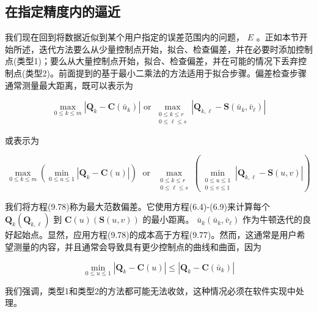 \documentclass[../main.tex]{subfiles}
\begin{document}
\subsection{在指定精度内的逼近}

我们现在回到将数据近似到某个用户指定的误差范围内的问题， \(E\) 。正如本节开始所述，迭代方法要么从少量控制点开始，拟合、检查偏差，并在必要时添加控制点(类型1)；要么从大量控制点开始，拟合、检查偏差，并在可能的情况下丢弃控制点(类型2)。前面提到的基于最小二乘法的方法适用于拟合步骤。偏差检查步骤通常测量最大距离，既可以表示为

\[
\mathop{\max }\limits_{{0 \leq  k \leq  m}}\left| {{\mathbf{Q}}_{k} - \mathbf{C}\left( {\bar{u}}_{k}\right) }\right| \text{ or }\mathop{\max }\limits_{\substack{{0 \leq  k \leq  r} \\  {0 \leq  \ell  \leq  s} }}\left| {{\mathbf{Q}}_{k,\ell } - \mathbf{S}\left( {{\bar{u}}_{k},{\bar{v}}_{\ell }}\right) }\right|  \tag{9.77}
\]

或表示为

\[
\mathop{\max }\limits_{{0 \leq  k \leq  m}}\left( {\mathop{\min }\limits_{{0 \leq  u \leq  1}}\left| {{\mathbf{Q}}_{k} - \mathbf{C}\left( u\right) }\right| }\right) \;\text{ or }\;\mathop{\max }\limits_{\substack{{0 \leq  k \leq  r} \\  {0 \leq  \ell  \leq  s} }}\left( {\mathop{\min }\limits_{\substack{{0 \leq  u \leq  1} \\  {0 \leq  v \leq  1} }}\left| {{\mathbf{Q}}_{k,\ell } - \mathbf{S}\left( {u,v}\right) }\right| }\right)  \tag{9.78}
\]

我们将方程(9.78)称为最大范数偏差。它使用方程(6.4)-(6.9)来计算每个 \({\mathbf{Q}}_{k}\left( {\mathbf{Q}}_{k,\ell }\right)\) 到 \(\mathbf{C}\left( u\right) \left( {\mathbf{S}\left( {u,v}\right) }\right)\) 的最小距离。 \({\bar{u}}_{k}\left( {{\bar{u}}_{k},{\bar{v}}_{\ell }}\right)\) 作为牛顿迭代的良好起始点。显然，应用方程(9.78)的成本高于方程(9.77)。然而，这通常是用户希望测量的内容，并且通常会导致具有更少控制点的曲线和曲面，因为

\[
\mathop{\min }\limits_{{0 \leq  u \leq  1}}\left| {{\mathbf{Q}}_{k} - \mathbf{C}\left( u\right) }\right|  \leq  \left| {{\mathbf{Q}}_{k} - \mathbf{C}\left( {\bar{u}}_{k}\right) }\right|  \tag{9.79}
\]







我们强调，类型1和类型2的方法都可能无法收敛，这种情况必须在软件实现中处理。
\end{document}
